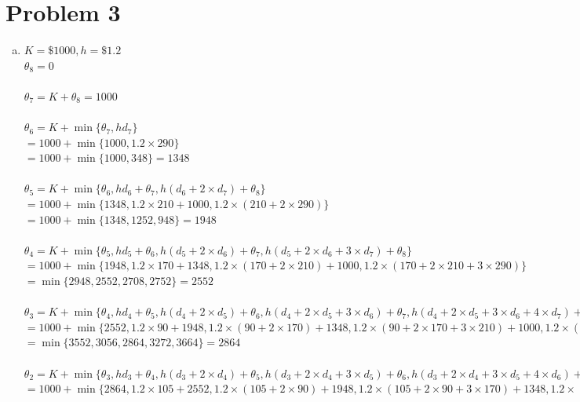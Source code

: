 \documentclass[a4paper]{article}
\begin{document}
\section{Problem 3}
    \begin{enumerate}[(a)]
        \item $K=\$1000,h=\$1.2$
        \\$\theta_8=0$
        \\\\$\theta_7=K+\theta_8=1000$
        \\\\$\theta_6=K+\min\{\theta_7,hd_7\}$
        \\$=1000+\min\{1000,1.2\times290\}$
        \\$=1000+\min\{1000,348\}=1348$
        \\\\$\theta_5=K+\min\{\theta_6,hd_6+\theta_7,h(d_6+2\times d_7)+\theta_8\}$
        \\$=1000+\min\{1348,1.2\times 210+1000,1.2\times(210+2\times290)\}$
        \\$=1000+\min\{1348,1252,948\}=1948$
        \\\\$\theta_4=K+\min\{\theta_5,hd_5+\theta_6,h(d_5+2\times d_6)+\theta_7,h(d_5+2\times d_6+3\times d_7)+\theta_8\}$
        \\$=1000+\min\{1948,1.2\times170+1348,1.2\times(170+2\times210)+1000,1.2\times(170+2\times210+3\times290)\}$
        \\$=\min\{2948,2552,2708,2752\}=2552$
        \\\\$\theta_3=K+\min\{\theta_4,hd_4+\theta_5,h(d_4+2\times d_5)+\theta_6,h(d_4+2\times d_5+3\times d_6)+\theta_7,h(d_4+2\times d_5+3\times d_6+4\times d_7)+\theta_8\}$
        \\$=1000+\min\{2552,1.2\times90+1948,1.2\times(90+2\times170)+1348,1.2\times(90+2\times170+3\times210)+1000,1.2\times(90+2\times170+3\times210+4\times290)\}$
        \\$=\min\{3552,3056,2864,3272,3664\}=2864$
        \\\\$\theta_2=K+\min\{\theta_3,hd_3+\theta_4,h(d_3+2\times d_4)+\theta_5,h(d_3+2\times d_4+3\times d_5)+\theta_6,h(d_3+2\times d_4+3\times d_5+4\times d_6)+\theta_7,h(d_3+2\times d_4+3\times d_5+4\times d_6+5\times d_7)+\theta_8\}$
        \\$=1000+\min\{2864,1.2\times105+2552,1.2\times(105+2\times90)+1948,1.2\times(105+2\times90+3\times170)+1348,1.2\times(105+2\times90+3\times170+4\times210)+1000,1.2\times(105+2\times90+3\times170+4\times210+5\times290)\}$

\end{enumerate}
\end{document}
